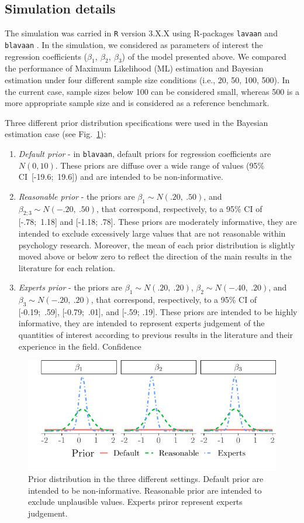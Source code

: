\documentclass[graybox]{svmult}
\begin{document}
\subsection{Simulation details}

The simulation was carried in \texttt{R} version 3.X.X \cite{rcoreteamLanguageEnvironmentStatistical2018} using R-packages \texttt{lavaan} \cite{rosseelLavaanPackageStructural2012} and \texttt{blavaan} \cite{merkleBlavaanBayesianStructural2018}. In the simulation, we  considered as parameters of interest the regression coefficients ($\beta_1,\ \beta_2,\ \beta_3$) of the model presented above. We compared the performance of Maximum Likelihood (ML) estimation and Bayesian estimation under four different sample size conditions (i.e., 20, 50, 100, 500). In the current case, sample sizes below 100 can be considered small, whereas 500 is a more appropriate sample size and is considered as a reference benchmark.

Three different prior distribution specifications were used in the Bayesian estimation case (see Fig.~\ref{fig:prior}):
\begin{enumerate}
	\item{\textit{Default prior} -  in \texttt{blavaan}, default priors for regression coefficients are $N(0,10)$}. These priors are diffuse over a wide range of values (95\% CI\ [-19.6;\ 19.6]) and are intended to be non-informative.
	\item{\textit{Reasonable prior} - the priors are $\beta_1\sim N(.20,\ .50)$, and  $\beta_{2;3}\sim N(-.20,\ .50)$, that correspond, respectively, to a 95\% CI of  [-.78;\ 1.18] and  [-1.18; .78]. These priors are moderately informative, they are intended to exclude excessively large values that are not reasonable within psychology research. Moreover, the mean of each prior distribution is slightly moved above or below zero to reflect the direction of the main results in the literature for each relation.}
 	\item{\textit{Experts prior} - the priors are $\beta_1\sim N(.20,\ .20)$,  $\beta_{2}\sim N(-.40,\ .20)$}, and $\beta_3\sim N(-.20,\ .20)$, that correspond, respectively, to a 95\% CI of  [-0.19;\ .59], [-0.79;\ .01], and  [-.59; .19]. These priors are intended to be highly informative, they are intended to represent experts judgement of the quantities of interest according to previous results in the literature and their experience in the field. Confidence 
\end{enumerate}
\begin{figure}[t]
	\sidecaption
	\includegraphics[width = .60\textwidth]{figure/Plot_prior}
	\caption{Prior distribution in the three different settings. Default prior are intended to be non-informative. Reasonable prior  are intended to exclude unplausible values. Experts priror represent experts judgement.}
	\label{fig:prior}
\end{figure}
\end{document}
